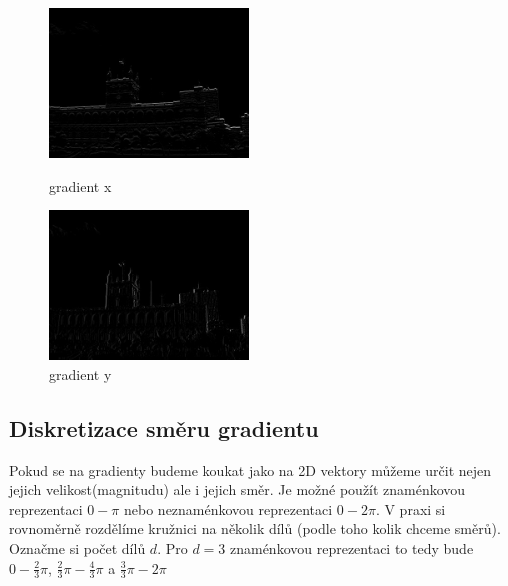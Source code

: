 \documentclass{report}
\begin{document}
\begin{figure}[htp]
	\centering
	\begin{minipage}[c]{150pt}
		\centering
		\includegraphics[width=150pt]{./img/gradientX.png}
		\caption{gradient x}
	\end{minipage}
	\begin{minipage}[c]{150pt}
		\includegraphics[width=150pt]{./img/gradientY.png}
		\caption{gradient y}
		\centering
	\end{minipage}
\end{figure}

\subsection{Diskretizace směru gradientu}
Pokud se na gradienty budeme koukat jako na 2D vektory můžeme určit nejen jejich velikost(magnitudu) ale i jejich směr. Je možné použít znaménkovou reprezentaci $0 - \pi$ nebo neznaménkovou reprezentaci $0 - 2\pi$.  V praxi si rovnoměrně rozdělíme kružnici na několik dílů (podle toho kolik chceme směrů). Označme si počet dílů $d$. Pro $d = 3$ znaménkovou reprezentaci to tedy bude $0 - \frac{2}{3}\pi$, $\frac{2}{3}\pi - \frac{4}{3}\pi$ a $\frac{3}{3}\pi - 2\pi$ 
\end{document}
